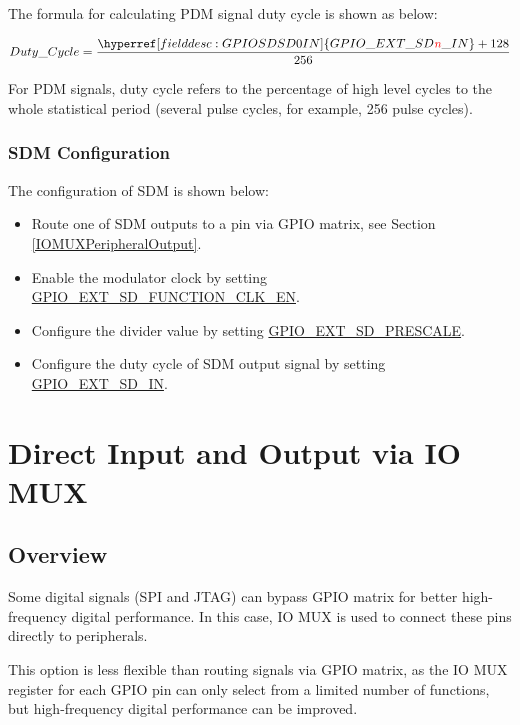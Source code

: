 \documentclass[main\_\_EN.tex]{subfiles}
\begin{document}
The formula for calculating PDM signal duty cycle is shown as below:

    \[
    Duty\_Cycle=\frac{\hyperref[fielddesc:GPIOSDSD0IN]{GPIO\_EXT\_SD\regindex{n}\_IN} + 128} {256}
    \]
    
\begin{tiplisting}
For PDM signals, duty cycle refers to the percentage of high level cycles to the whole statistical period (several pulse cycles, for example, 256 pulse cycles).
\end{tiplisting}

\subsubsection{SDM Configuration}

The configuration of SDM is shown below:

\begin{itemize}
    \item Route one of SDM outputs to a pin via GPIO matrix, see Section  \ref{IOMUXPeripheralOutput}.
    \item Enable the modulator clock by setting  \hyperref[fielddesc:GPIOSDFUNCTIONCLKEN]{GPIO\_EXT\_SD\_FUNCTION\_CLK\_EN}.
    \item Configure the divider value by setting  \hyperref[fielddesc:GPIOSDSD0PRESCALE]{GPIO\_EXT\_SD\_PRESCALE}.
    \item Configure the duty cycle of SDM output signal by setting  \hyperref[fielddesc:GPIOSDSD0IN]{GPIO\_EXT\_SD\_IN}.
\end{itemize}

\section{Direct Input and Output via IO MUX}

\subsection{Overview}

Some digital signals (SPI and JTAG) can bypass GPIO matrix for better high-frequency digital performance. In this case, IO MUX is used to connect these pins directly to peripherals.

This option is less flexible than routing signals via GPIO matrix, as the IO MUX register for each GPIO pin can only select from a limited number of functions, but high-frequency digital performance can be improved.
\end{document}
